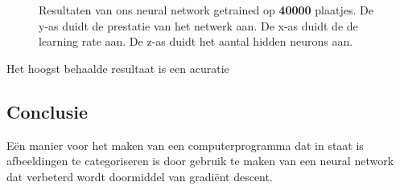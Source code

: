 \documentclass[a4paper,titlepage]{article}
\begin{document}
\begin{figure}[H]
\caption{Resultaten van ons neural network getrained op \textbf{40000} plaatjes. 
De y-as duidt de prestatie van het netwerk aan. 
De x-as duidt de de learning rate aan. 
De z-as duidt het aantal hidden neurons aan.}
\end{figure}

Het hoogst behaalde resultaat is een acuratie 

\subsection{Conclusie}
E\"en manier voor het maken van een computerprogramma dat in staat is afbeeldingen te categoriseren is door gebruik te maken van een neural network dat verbeterd wordt doormiddel van gradi\"ent descent.
\end{document}
